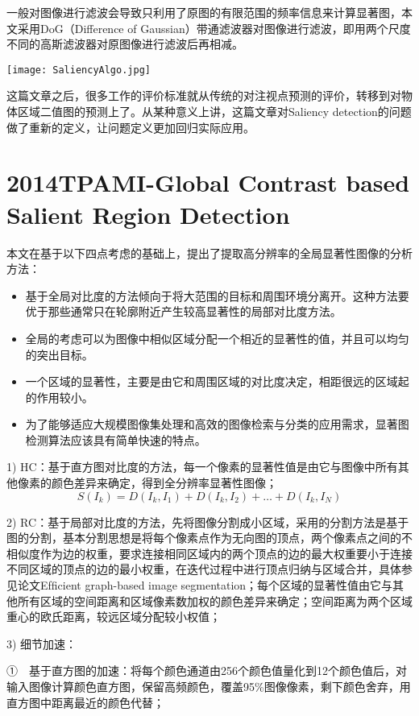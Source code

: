 \documentclass[a4paper,12pt]{article}
\begin{document}
一般对图像进行滤波会导致只利用了原图的有限范围的频率信息来计算显著图，本文采用DoG（Difference of Gaussian）带通滤波器对图像进行滤波，即用两个尺度不同的高斯滤波器对原图像进行滤波后再相减。

\texttt{[image: SaliencyAlgo.jpg]}

这篇文章之后，很多工作的评价标准就从传统的对注视点预测的评价，转移到对物体区域二值图的预测上了。从某种意义上讲，这篇文章对Saliency detection的问题做了重新的定义，让问题定义更加回归实际应用。



\section{2014TPAMI-Global Contrast based Salient Region Detection}
本文在基于以下四点考虑的基础上，提出了提取高分辨率的全局显著性图像的分析方法：
\begin{itemize}
\item 基于全局对比度的方法倾向于将大范围的目标和周围环境分离开。这种方法要优于那些通常只在轮廓附近产生较高显著性的局部对比度方法。
\item 全局的考虑可以为图像中相似区域分配一个相近的显著性的值，并且可以均匀的突出目标。
\item 一个区域的显著性，主要是由它和周围区域的对比度决定，相距很远的区域起的作用较小。
\item 为了能够适应大规模图像集处理和高效的图像检索与分类的应用需求，显著图检测算法应该具有简单快速的特点。
\end{itemize}

1) HC：基于直方图对比度的方法，每一个像素的显著性值是由它与图像中所有其他像素的颜色差异来确定，得到全分辨率显著性图像；
\begin{displaymath}
S(I_k)=D(I_k,I_1)+D(I_k,I_2)+\ldots+D(I_k,I_N)
\end{displaymath}

2) RC：基于局部对比度的方法，先将图像分割成小区域，采用的分割方法是基于图的分割，基本分割思想是将每个像素点作为无向图的顶点，两个像素点之间的不相似度作为边的权重，要求连接相同区域内的两个顶点的边的最大权重要小于连接不同区域的顶点的边的最小权重，在迭代过程中进行顶点归纳与区域合并，具体参见论文Efﬁcient graph-based image segmentation；每个区域的显著性值由它与其他所有区域的空间距离和区域像素数加权的颜色差异来确定；空间距离为两个区域重心的欧氏距离，较远区域分配较小权值；

3) 细节加速：

①　基于直方图的加速：将每个颜色通道由256个颜色值量化到12个颜色值后，对输入图像计算颜色直方图，保留高频颜色，覆盖95\%图像像素，剩下颜色舍弃，用直方图中距离最近的颜色代替；
\end{document}
